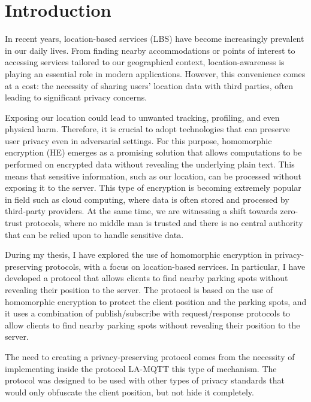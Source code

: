 \chapter{Introduction} \label{chap:intro}

%
%

In recent years, location-based services (LBS) have become increasingly prevalent in our daily lives. From finding nearby accommodations or points of interest to accessing services tailored to our geographical context, location-awareness is playing an essential role in modern applications. However, this convenience comes at a cost: the necessity of sharing users' location data with third parties, often leading to significant privacy concerns.

Exposing our location could lead to unwanted tracking, profiling, and even physical harm. Therefore, it is crucial to adopt technologies that can preserve user privacy even in adversarial settings. For this purpose, homomorphic encryption (HE) emerges as a promising solution that allows computations to be performed on encrypted data without revealing the underlying plain text. This means that sensitive information, such as our location, can be processed without exposing it to the server. This type of encryption is becoming extremely popular in field such as cloud computing, where data is often stored and processed by third-party providers. 
At the same time, we are witnessing a shift towards zero-trust protocols, where no middle man is trusted and there is no central authority that can be relied upon to handle sensitive data. 


During my thesis, I have explored the use of homomorphic encryption in privacy-preserving protocols, with a focus on location-based services. In particular, I have developed a protocol that allows clients to find nearby parking spots without revealing their position to the server. The protocol is based on the use of homomorphic encryption to protect the client position and the parking spots, and it uses a combination of publish/subscribe with request/response protocols to allow clients to find nearby parking spots without revealing their position to the server.

The need to creating a privacy-preserving protocol comes from the necessity of implementing inside the protocol LA-MQTT this type of mechanism. The protocol was designed to be used with other types of privacy standards that would only obfuscate the client position, but not hide it completely.
